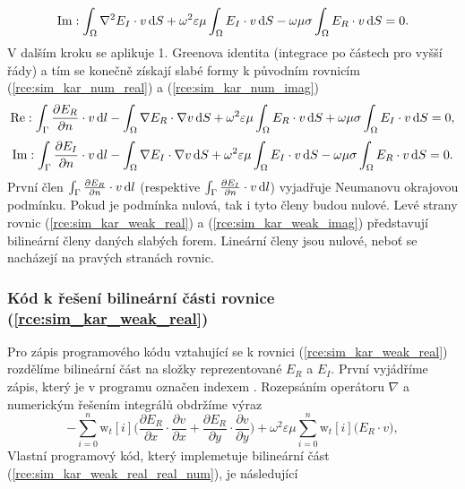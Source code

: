 \begin{equation}
	\mathrm{Im} : \int_{\Omega}\nabla^{2} E_I\cdot v\,\mathrm{d} S + \omega^{2}\varepsilon\mu\int_{\Omega} E_I\cdot v\,\mathrm{d} S - \omega\mu\sigma\int_{\Omega} E_R\cdot v\,\mathrm{d} S = 0.
	\label{rce:sim_kar_weak_odv_imag} 
\end{equation}
V dalším kroku se aplikuje 1. Greenova identita \cite[příloha A.2]{num} (integrace po částech pro vyšší řády) a tím se konečně získají slabé formy k původním rovnicím (\ref{rce:sim_kar_num_real}) a (\ref{rce:sim_kar_num_imag})
\begin{equation}
	\mathrm{Re} : \int_{\Gamma}\frac{\partial E_R}{\partial n}\cdot v\,\mathrm{d} l-\int_{\Omega}\nabla E_R\cdot\nabla v \,\mathrm{d} S + \omega^{2}\varepsilon\mu\int_{\Omega} E_R\cdot v\,\mathrm{d} S + \omega\mu\sigma\int_{\Omega} E_I\cdot v\,\mathrm{d} S = 0,
	\label{rce:sim_kar_weak_real} 
\end{equation}
\begin{equation}
	\mathrm{Im} : \int_{\Gamma}\frac{\partial E_I}{\partial n}\cdot v\,\mathrm{d} l-\int_{\Omega}\nabla E_I\cdot\nabla v\,\mathrm{d} S + \omega^{2}\varepsilon\mu\int_{\Omega} E_I\cdot v\,\mathrm{d} S - \omega\mu\sigma\int_{\Omega} E_R\cdot v\,\mathrm{d} S = 0.
	\label{rce:sim_kar_weak_imag} 
\end{equation}
První člen $\int_{\Gamma}\frac{\partial E_R}{\partial n}\cdot v\,\mathrm{d} l$ (respektive $\int_{\Gamma}\frac{\partial E_I}{\partial n}\cdot v\,\mathrm{d} l$) vyjadřuje Neumanovu okrajovou podmínku. Pokud je podmínka nulová, tak i tyto členy budou nulové. Levé strany rovnic (\ref{rce:sim_kar_weak_real}) a (\ref{rce:sim_kar_weak_imag}) představují bilineární členy daných slabých forem. Lineární členy jsou nulové, neboť se nacházejí na pravých stranách rovnic. 

\subsubsection*{Kód k řešení bilineární části rovnice (\ref{rce:sim_kar_weak_real})}
Pro zápis programového kódu vztahující se k rovnici (\ref{rce:sim_kar_weak_real}) rozdělíme bilineární část na složky reprezentované $E_{R}$ a $E_{I}$. První vyjádříme zápis, který je v programu označen indexem . Rozepsáním operátoru $\nabla$ a numerickým řešením integrálů obdržíme výraz
\begin{equation}
	-\sum_{i=0}^{n}\mathrm{w}_{t}[i]\bigg(\frac{\partial E_R}{\partial x}\cdot \frac{\partial v}{\partial x} + \frac{\partial E_R}{\partial y}\cdot \frac{\partial v}{\partial y} \bigg) + \omega^{2}\varepsilon\mu\sum_{i=0}^{n}\mathrm{w}_{t}[i]\bigg(E_R\cdot v\bigg),
	\label{rce:sim_kar_weak_real_real_num} 
\end{equation}
Vlastní programový kód, který implemetuje bilineární část (\ref{rce:sim_kar_weak_real_real_num}), je následující

